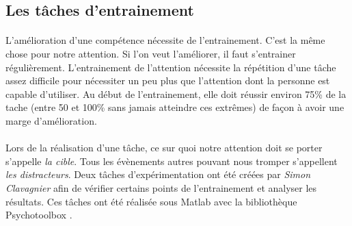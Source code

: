 





\newpage
\subsection{Les tâches d'entrainement}
\label{TrainingSection}

\paragraph{}L'amélioration d'une compétence nécessite de l'entrainement. C'est la même chose pour notre attention. Si l'on veut l'améliorer, il faut s'entrainer régulièrement.
L'entrainement de l'attention nécessite la répétition d'une tâche assez difficile pour nécessiter un peu plus que l'attention dont la personne est capable d'utiliser. Au début de
l'entrainement, elle doit réussir environ 75\% de la tache (entre 50 et 100\% sans jamais atteindre ces extrêmes) de façon à avoir une marge d'amélioration.

\paragraph{}Lors de la réalisation d'une tâche, ce sur quoi notre attention doit se porter s'appelle \emph{la cible}. Tous les évènements autres pouvant nous tromper s'appellent
\emph{les distracteurs}. Deux tâches d'expérimentation ont été créées par \emph{Simon Clavagnier} afin de vérifier certains points de l'entrainement et analyser les résultats. Ces
tâches ont été réalisée sous \gls{Matlab} avec la bibliothèque \gls{Psychotoolbox} .




 \newpage




\newpage